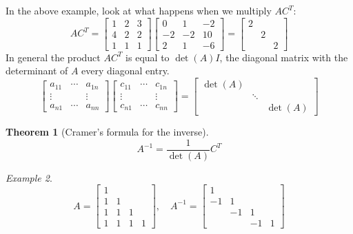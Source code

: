 \documentclass[11pt,oneside]{amsbook}
\theoremstyle{definition}
\theoremstyle{plain}
\newtheorem{theorem}{Theorem}[section]
\theoremstyle{definition}
\theoremstyle{remark}
\newtheorem{example}[theorem]{Example}
\numberwithin{equation}{section}
\numberwithin{figure}{section}
\begin{document}
In the above example, look at what happens when we multiply $AC^T$:
\[AC^T=\begin{bmatrix}1&2&3\\4&2&2\\1&1&1\end{bmatrix}
  \begin{bmatrix}0&1&-2\\-2&-2&10\\2&1&-6\end{bmatrix}
  =\begin{bmatrix}2\\&2\\&&2\end{bmatrix}
\]
In general the product $AC^T$ is equal to $\det(A)I$, the diagonal matrix with the determinant of $A$ every diagonal entry.
\[\begin{bmatrix}
    a_{11}&\cdots&a_{1n}\\
    \vdots&&\vdots\\
    a_{n1}&\cdots&a_{nn}
  \end{bmatrix}
  \begin{bmatrix}
    c_{11}&\cdots&c_{1n}\\
    \vdots&&\vdots\\
    c_{n1}&\cdots&c_{nn}
  \end{bmatrix}
  =\begin{bmatrix}
    \det(A)\\&\ddots\\&&\det(A)
  \end{bmatrix}
\]

\begin{theorem}[Cramer's formula for the inverse]
  \[A^{-1}=\frac{1}{\det(A)}C^T
  \]
\end{theorem}

\begin{example}
  \[A=\begin{bmatrix}1\\1&1\\1&1&1\\1&1&1&1\end{bmatrix},\quad
    A^{-1}=\begin{bmatrix}1\\-1&1\\&-1&1\\&&-1&1\end{bmatrix}
  \]
\end{example}
\end{document}

